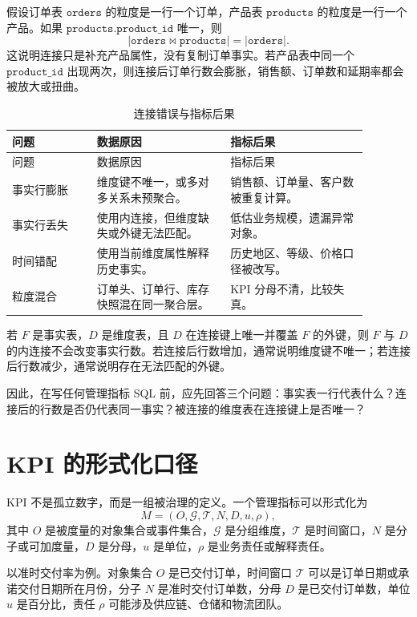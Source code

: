 \documentclass[UTF8,fontset=fandol,openany,zihao=-4]{ctexbook}
\begin{document}
假设订单表 \(\texttt{orders}\) 的粒度是一行一个订单，产品表 \(\texttt{products}\) 的粒度是一行一个产品。如果 \(\texttt{products.product\_id}\) 唯一，则
\[
|\texttt{orders}\Join\texttt{products}|=|\texttt{orders}|.
\]
这说明连接只是补充产品属性，没有复制订单事实。若产品表中同一个 \(\texttt{product\_id}\) 出现两次，则连接后订单行数会膨胀，销售额、订单数和延期率都会被放大或扭曲。

\begin{longtable}{p{0.21\linewidth}p{0.33\linewidth}p{0.34\linewidth}}
\caption{连接错误与指标后果}\\
\toprule
问题 & 数据原因 & 指标后果\\
\midrule
\endfirsthead
\toprule
问题 & 数据原因 & 指标后果\\
\midrule
\endhead
事实行膨胀 & 维度键不唯一，或多对多关系未预聚合。 & 销售额、订单量、客户数被重复计算。\\
事实行丢失 & 使用内连接，但维度缺失或外键无法匹配。 & 低估业务规模，遗漏异常对象。\\
时间错配 & 使用当前维度属性解释历史事实。 & 历史地区、等级、价格口径被改写。\\
粒度混合 & 订单头、订单行、库存快照混在同一聚合层。 & KPI 分母不清，比较失真。\\
\bottomrule
\end{longtable}

\begin{proposition}[连接前后的行数检查]
若 \(F\) 是事实表，\(D\) 是维度表，且 \(D\) 在连接键上唯一并覆盖 \(F\) 的外键，则 \(F\) 与 \(D\) 的内连接不会改变事实行数。若连接后行数增加，通常说明维度键不唯一；若连接后行数减少，通常说明存在无法匹配的外键。
\end{proposition}

因此，在写任何管理指标 SQL 前，应先回答三个问题：事实表一行代表什么？连接后的行数是否仍代表同一事实？被连接的维度表在连接键上是否唯一？

\section{KPI 的形式化口径}

KPI 不是孤立数字，而是一组被治理的定义。一个管理指标可以形式化为
\[
M=(O,\mathcal G,\mathcal T,N,D,u,\rho),
\]
其中 \(O\) 是被度量的对象集合或事件集合，\(\mathcal G\) 是分组维度，\(\mathcal T\) 是时间窗口，\(N\) 是分子或可加度量，\(D\) 是分母，\(u\) 是单位，\(\rho\) 是业务责任或解释责任。

以准时交付率为例。对象集合 \(O\) 是已交付订单，时间窗口 \(\mathcal T\) 可以是订单日期或承诺交付日期所在月份，分子 \(N\) 是准时交付订单数，分母 \(D\) 是已交付订单数，单位 \(u\) 是百分比，责任 \(\rho\) 可能涉及供应链、仓储和物流团队。
\end{document}
